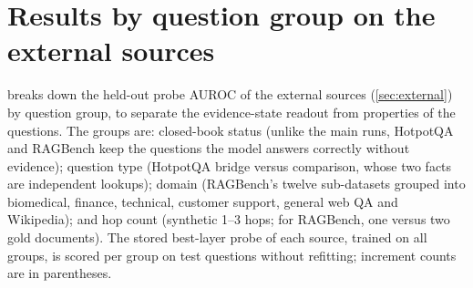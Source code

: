 \section{Results by question group on the external sources}
\label{app:groups}
 breaks down the held-out probe AUROC of the external sources (\cref{sec:external}) by question group, to separate the evidence-state readout from properties of the questions. The groups are: closed-book status (unlike the main runs, HotpotQA and RAGBench keep the questions the model answers correctly without evidence); question type (HotpotQA bridge versus comparison, whose two facts are independent lookups); domain (RAGBench's twelve sub-datasets grouped into biomedical, finance, technical, customer support, general web QA and Wikipedia); and hop count (synthetic 1--3 hops; for RAGBench, one versus two gold documents). The stored best-layer probe of each source, trained on all groups, is scored per group on test questions without refitting; increment counts are in parentheses.
\begin{table}[t]
\centering\scriptsize

\caption{Held-out probe AUROC by question group (test-set increment counts in parentheses): closed-book status, question type, domain and hop count.}
\label{tab:groups}
\end{table}
